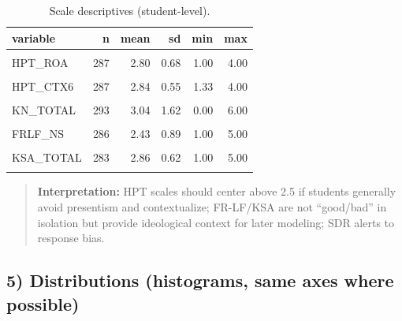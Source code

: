 \documentclass[
  10pt,
]{article}
\begin{document}
\begin{longtable}[t]{lrrrrr}
\caption{\label{tab:descriptives}Scale descriptives (student-level).}\\
\toprule
variable & n & mean & sd & min & max\\
\midrule
\cellcolor{gray!10}{HPT\_POP} & \cellcolor{gray!10}{287} & \cellcolor{gray!10}{2.97} & \cellcolor{gray!10}{0.64} & \cellcolor{gray!10}{1.33} & \cellcolor{gray!10}{4.00}\\
HPT\_ROA & 287 & 2.80 & 0.68 & 1.00 & 4.00\\
\cellcolor{gray!10}{HPT\_CONT} & \cellcolor{gray!10}{287} & \cellcolor{gray!10}{2.71} & \cellcolor{gray!10}{0.74} & \cellcolor{gray!10}{1.00} & \cellcolor{gray!10}{4.00}\\
HPT\_CTX6 & 287 & 2.84 & 0.55 & 1.33 & 4.00\\
\cellcolor{gray!10}{HPT\_TOT9} & \cellcolor{gray!10}{287} & \cellcolor{gray!10}{2.83} & \cellcolor{gray!10}{0.49} & \cellcolor{gray!10}{1.67} & \cellcolor{gray!10}{3.89}\\
\addlinespace
KN\_TOTAL & 293 & 3.04 & 1.62 & 0.00 & 6.00\\
\cellcolor{gray!10}{FRLF\_RD} & \cellcolor{gray!10}{285} & \cellcolor{gray!10}{2.54} & \cellcolor{gray!10}{0.88} & \cellcolor{gray!10}{1.00} & \cellcolor{gray!10}{5.00}\\
FRLF\_NS & 286 & 2.43 & 0.89 & 1.00 & 5.00\\
\cellcolor{gray!10}{FRLF\_MINI} & \cellcolor{gray!10}{284} & \cellcolor{gray!10}{2.48} & \cellcolor{gray!10}{0.75} & \cellcolor{gray!10}{1.00} & \cellcolor{gray!10}{5.00}\\
KSA\_TOTAL & 283 & 2.86 & 0.62 & 1.00 & 5.00\\
\addlinespace
\cellcolor{gray!10}{SDR\_TOTAL} & \cellcolor{gray!10}{283} & \cellcolor{gray!10}{3.02} & \cellcolor{gray!10}{0.63} & \cellcolor{gray!10}{1.00} & \cellcolor{gray!10}{4.60}\\
\bottomrule
\end{longtable}

\begin{quote}
\textbf{Interpretation:} HPT scales should center above 2.5 if students
generally avoid presentism and contextualize; FR-LF/KSA are not
``good/bad'' in isolation but provide ideological context for later
modeling; SDR alerts to response bias.
\end{quote}

\hypertarget{distributions-histograms-same-axes-where-possible}{%
\subsection{5) Distributions (histograms, same axes where
possible)}\label{distributions-histograms-same-axes-where-possible}}
\end{document}
